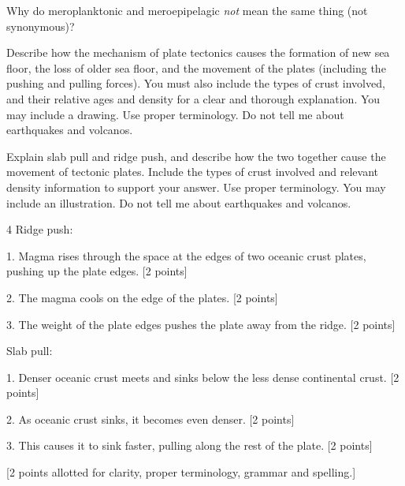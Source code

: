 \question[5]
Why do meroplanktonic and meroepipelagic \emph{not} mean the same thing (not synonymous)?





\question[15]
Describe how the mechanism of plate tectonics causes the formation of new sea floor, the loss of older sea floor, and the movement of the plates (including the pushing and pulling forces). You must also include the types of crust involved, and their relative ages and density for a clear and thorough explanation. You may include a drawing. Use proper terminology. Do not tell me about earthquakes and volcanos. 

\question[15]
Explain slab pull and ridge push, and describe how the two together cause the movement of tectonic plates. Include the types of crust involved and relevant density information to support your answer. Use proper terminology. You may include an illustration. Do not tell me about earthquakes and volcanos. 


 	\begin{AnswerPage}{4\basespace}
	Ridge push: 
	\vspace*{0.5\baselineskip}
	
	1. Magma rises through the space at the edges of two oceanic crust plates, pushing up the plate edges. [2 points]
	\vspace*{0.5\baselineskip}
	
	2. The magma cools on the edge of the plates. [2 points]
	\vspace*{0.5\baselineskip}
	
	3. The weight of the plate edges pushes the plate away from the ridge.  [2 points]
	\vspace*{1\baselineskip}
	
	Slab pull:
	\vspace*{0.5\baselineskip}
	
	1. Denser oceanic crust meets and sinks below the less dense continental crust. [2 points]
	\vspace*{0.5\baselineskip}
	
	2. As oceanic crust sinks, it becomes even denser. [2 points]
	\vspace*{0.5\baselineskip}
	
	3. This causes it to sink faster, pulling along the rest of the plate. [2 points]
	\vspace*{1\baselineskip}
	
	[2 points allotted for clarity, proper terminology, grammar and spelling.]
	
	\end{AnswerPage}




